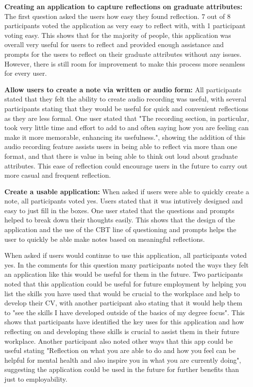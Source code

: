 \documentclass{l4proj}
\begin{document}
\textbf{Creating an application to capture reflections on graduate attributes:} The first question asked the users how easy they found reflection. 7 out of 8 participants voted the application as very easy to reflect with, with 1 participant voting easy. This shows that for the majority of people, this application was overall very useful for users to reflect and provided enough assistance and prompts for the users to reflect on their graduate attributes without any issues. However, there is still room for improvement to make this process more seamless for every user.

\textbf{Allow users to create a note via written or audio form:} All participants stated that they felt the ability to create audio recording was useful, with several participants stating that they would be useful for quick and convenient reflections as they are less formal. One user stated that "The recording section, in particular, took very little time and effort to add to and often saying how you are feeling can make it more memorable, enhancing its usefulness.", showing the addition of this audio recording feature assists users in being able to reflect via more than one format, and that there is value in being able to think out loud about graduate attributes. This ease of reflection could encourage users in the future to carry out more casual and frequent reflection. 

\textbf{Create a usable application:} When asked if users were able to quickly create a note, all participants voted yes. Users stated that it was intutively designed and easy to just fill in the boxes. One user stated that the questions and prompts helped to break down their thoughts easily. This shows that the design of the application and the use of the CBT line of questioning and prompts helps the user to quickly be able make notes based on meaningful reflections. 

When asked if users would continue to use this application, all participants voted yes. In the comments for this question many participants noted the ways they felt an application like this would be useful for them in the future. Two participants noted that this application could be useful for future employment by helping you list the skills you have used that would be crucial to the workplace and help to develop their CV, with another participant also stating that it would help them to "see the skills I have developed outside of the basics of my degree focus". This shows that participants have identified the key uses for this application and how reflecting on and developing these skills is crucial to assist them in their future workplace. Another participant also noted other ways that this app could be useful stating "Reflection on what you are able to do and how you feel can be helpful for mental health and also inspire you in what you are currently doing", suggesting the application could be used in the future for further benefits than just to employability.
 
\end{document}

